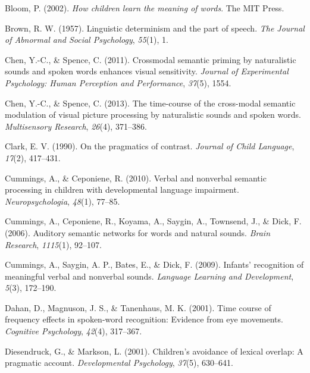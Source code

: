 \documentclass[english,floatsintext,man]{apa6}
\theoremstyle{definition}
\theoremstyle{definition}
\theoremstyle{definition}
\theoremstyle{remark}
\begin{document}
\leavevmode\hypertarget{ref-bloom2002children}{}%
Bloom, P. (2002). \emph{How children learn the meaning of words}. The
MIT Press.

\leavevmode\hypertarget{ref-brown1957linguistic}{}%
Brown, R. W. (1957). Linguistic determinism and the part of speech.
\emph{The Journal of Abnormal and Social Psychology}, \emph{55}(1), 1.

\leavevmode\hypertarget{ref-chen2011crossmodal}{}%
Chen, Y.-C., \& Spence, C. (2011). Crossmodal semantic priming by
naturalistic sounds and spoken words enhances visual sensitivity.
\emph{Journal of Experimental Psychology: Human Perception and
Performance}, \emph{37}(5), 1554.

\leavevmode\hypertarget{ref-chen2013time}{}%
Chen, Y.-C., \& Spence, C. (2013). The time-course of the cross-modal
semantic modulation of visual picture processing by naturalistic sounds
and spoken words. \emph{Multisensory Research}, \emph{26}(4), 371--386.

\leavevmode\hypertarget{ref-clark1990pragmatics}{}%
Clark, E. V. (1990). On the pragmatics of contrast. \emph{Journal of
Child Language}, \emph{17}(2), 417--431.

\leavevmode\hypertarget{ref-cummings2010verbal}{}%
Cummings, A., \& Ceponiene, R. (2010). Verbal and nonverbal semantic
processing in children with developmental language impairment.
\emph{Neuropsychologia}, \emph{48}(1), 77--85.

\leavevmode\hypertarget{ref-cummings2006auditory}{}%
Cummings, A., Ceponiene, R., Koyama, A., Saygin, A., Townsend, J., \&
Dick, F. (2006). Auditory semantic networks for words and natural
sounds. \emph{Brain Research}, \emph{1115}(1), 92--107.

\leavevmode\hypertarget{ref-cummings2009infants}{}%
Cummings, A., Saygin, A. P., Bates, E., \& Dick, F. (2009). Infants'
recognition of meaningful verbal and nonverbal sounds. \emph{Language
Learning and Development}, \emph{5}(3), 172--190.

\leavevmode\hypertarget{ref-dahan2001time}{}%
Dahan, D., Magnuson, J. S., \& Tanenhaus, M. K. (2001). Time course of
frequency effects in spoken-word recognition: Evidence from eye
movements. \emph{Cognitive Psychology}, \emph{42}(4), 317--367.

\leavevmode\hypertarget{ref-diesendruck2001children}{}%
Diesendruck, G., \& Markson, L. (2001). Children's avoidance of lexical
overlap: A pragmatic account. \emph{Developmental Psychology},
\emph{37}(5), 630--641.
\end{document}
